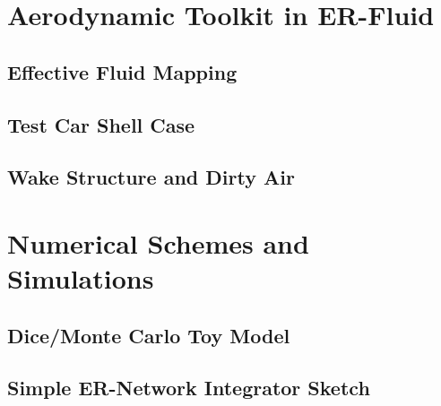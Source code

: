 \section{Aerodynamic Toolkit in ER-Fluid}
\label{app:aero}

\subsection{Effective Fluid Mapping}

\subsection{Test Car Shell Case}

\subsection{Wake Structure and Dirty Air}

\section{Numerical Schemes and Simulations}
\label{app:numerics}

\subsection{Dice/Monte Carlo Toy Model}

\subsection{Simple ER-Network Integrator Sketch}
